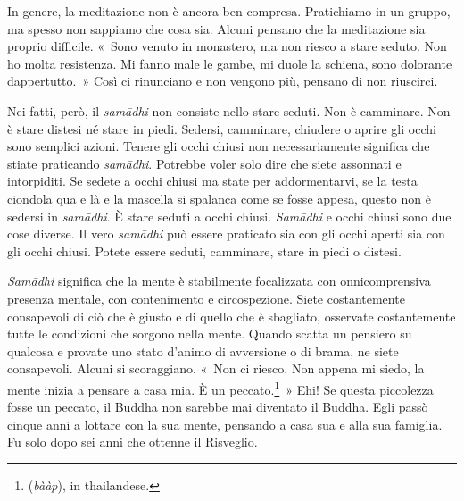 In genere, la meditazione non è ancora ben compresa. Pratichiamo in un
gruppo, ma spesso non sappiamo che cosa sia. Alcuni pensano che la
meditazione sia proprio difficile. «~Sono venuto in monastero, ma non
riesco a stare seduto. Non ho molta resistenza. Mi fanno male le gambe,
mi duole la schiena, sono dolorante dappertutto.~» Così ci rinunciano e
non vengono più, pensano di non riuscirci.

Nei fatti, però, il \emph{samādhi} non consiste nello stare seduti. Non
è camminare. Non è stare distesi né stare in piedi. Sedersi, camminare,
chiudere o aprire gli occhi sono semplici azioni. Tenere gli occhi
chiusi non necessariamente significa che stiate praticando
\emph{samādhi}. Potrebbe voler solo dire che siete assonnati e
intorpiditi. Se sedete a occhi chiusi ma state per addormentarvi, se la
testa ciondola qua e là e la mascella si spalanca come se fosse appesa,
questo non è sedersi in \emph{samādhi}. È stare seduti a occhi chiusi.
\emph{Samādhi} e occhi chiusi sono due cose diverse. Il vero
\emph{samādhi} può essere praticato sia con gli occhi aperti sia con gli
occhi chiusi. Potete essere seduti, camminare, stare in piedi o distesi.

\emph{Samādhi} significa che la mente è stabilmente focalizzata con
onnicomprensiva presenza mentale, con contenimento e circospezione.
Siete costantemente consapevoli di ciò che è giusto e di quello che è
sbagliato, osservate costantemente tutte le condizioni che sorgono nella
mente. Quando scatta un pensiero su qualcosa e provate uno stato d'animo
di avversione o di brama, ne siete consapevoli. Alcuni si scoraggiano.
«~Non ci riesco. Non appena mi siedo, la mente inizia a pensare a casa
mia. È un peccato.\footnote{ (\emph{bààp}), in thailandese.}~» Ehi!
Se questa piccolezza fosse un peccato, il Buddha non sarebbe mai
diventato il Buddha. Egli passò cinque anni a lottare con la sua mente,
pensando a casa sua e alla sua famiglia. Fu solo dopo sei anni che
ottenne il Risveglio.

